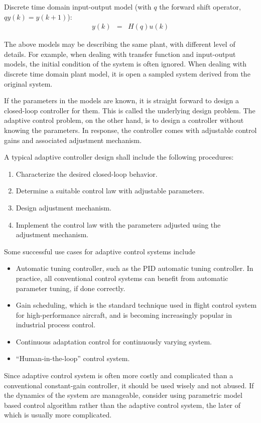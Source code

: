 Discrete time domain input-output model (with $q$ the forward shift operator, $qy(k) = y(k+1)$):
\begin{eqnarray}
	y(k) &=& H(q)u(k) \nonumber
\end{eqnarray}

The above models may be describing the same plant, with different level of details. For example, when dealing with transfer function and input-output models, the initial condition of the system is often ignored. When dealing with discrete time domain plant model, it is open a sampled system derived from the original system.

If the parameters in the models are known, it is straight forward to design a closed-loop controller for them. This is called the underlying design problem. The adaptive control problem, on the other hand, is to design a controller without knowing the parameters. In response, the controller comes with adjustable control gains and associated adjustment mechanism.

A typical adaptive controller design shall include the following procedures:
\begin{enumerate}
	\item Characterize the desired closed-loop behavior.
	\item Determine a suitable control law with adjustable parameters.
	\item Design adjustment mechanism.
	\item Implement the control law with the parameters adjusted using the adjustment mechanism.
\end{enumerate}

Some successful use cases for adaptive control systems include
\begin{itemize}
	\item Automatic tuning controller, such as the PID automatic tuning controller. In practice, all conventional control systems can benefit from automatic parameter tuning, if done correctly.
	\item Gain scheduling, which is the standard technique used in flight control system for high-performance aircraft, and is becoming increasingly popular in industrial process control.
	\item Continuous adaptation control for continuously varying system.
	\item ``Human-in-the-loop'' control system.
\end{itemize}

Since adaptive control system is often more costly and complicated than a conventional constant-gain controller, it should be used wisely and not abused. If the dynamics of the system are manageable, consider using parametric model based control algorithm rather than the adaptive control system, the later of which is usually more complicated.

